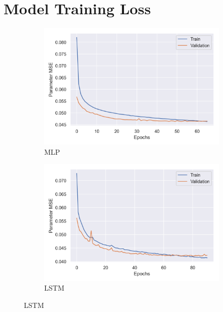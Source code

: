 \chapter{Model Training Loss}
\label{appendix:training-loss}

\begin{figure}[ht]
    \centering
    \begin{subfigure}[b]{0.49\textwidth}
        \centering
        \includegraphics[width=\textwidth]{figures/inverse-synth/loss-plots/mlp-mfcc.png}
        \caption{MLP}
    \end{subfigure}
    \begin{subfigure}[b]{0.49\textwidth}
        \centering
        \includegraphics[width=\textwidth]{figures/inverse-synth/loss-plots/lstm-mfcc.png}
        \caption{LSTM}
    \end{subfigure}
    
    \vspace{1cm}
    

\end{figure}
